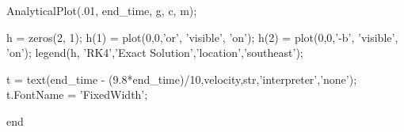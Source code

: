 \documentclass[12pt]{article}
\begin{document}
\begin{verbatimtab}
    AnalyticalPlot(.01, end_time, g, c, m);
    
    h = zeros(2, 1);                          %
    h(1) = plot(0,0,'or', 'visible', 'on');   %
    h(2) = plot(0,0,'-b', 'visible', 'on');   %
    legend(h, 'RK4','Exact Solution','location','southeast');
    
    t = text(end_time - (9.8*end_time)/10,velocity,str,'interpreter','none');
    t.FontName = 'FixedWidth'; %

    
end
\end{verbatimtab}
\newpage
\clearpage


\setcounter{page}{1} \pagestyle{empty}


\end{document}
